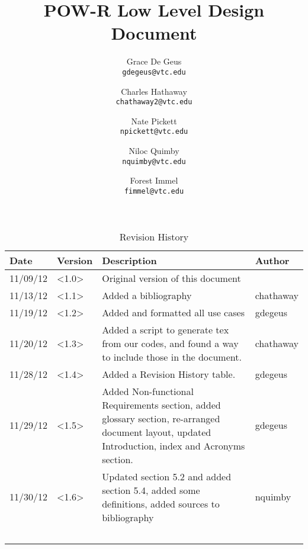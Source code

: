 \documentclass[titlepage]{report}
\begin{document}
\title{POW-R Low Level Design Document}
\author{
  Grace De Geus\\
  \texttt{gdegeus@vtc.edu}
  \and
  Charles Hathaway\\
  \texttt{chathaway2@vtc.edu}
  \and
  Nate Pickett\\
  \texttt{npickett@vtc.edu}
  \and
  Niloc Quimby\\
  \texttt{nquimby@vtc.edu}
  \and
  Forest Immel\\
  \texttt{fimmel@vtc.edu}
}
\maketitle



\setcounter{page}{1}


\begin{table}
\caption{Revision History}
    \begin{tabular}{|p{50pt}|p{50pt}|p{200pt}|p{50pt}|}
	\hline
	Date & Version & Description & Author\\  \hline
	11/09/12 & <1.0> & Original version of this document & \\  \hline
	11/13/12 & <1.1> & Added a bibliography & chathaway\\  \hline
	11/19/12 & <1.2> & Added and formatted all use cases & gdegeus\\  \hline
	11/20/12 & <1.3> & Added a script to generate tex from our codes, and found a way to include those in the document. & chathaway\\  \hline
	11/28/12 & <1.4> & Added a Revision History table. & gdegeus \\ \hline
	11/29/12 & <1.5> & Added Non-functional Requirements section, added glossary section, re-arranged document layout, updated Introduction, index and Acronyms section. & gdegeus \\  \hline
	11/30/12 & <1.6> & Updated section 5.2 and added section 5.4, added some definitions, added sources to bibliography & nquimby\\ \hline
	~    & ~       & ~           & ~      \\  \hline
    \end{tabular}

\end{table}
\newpage

\tableofcontents
\newpage
\end{document}
